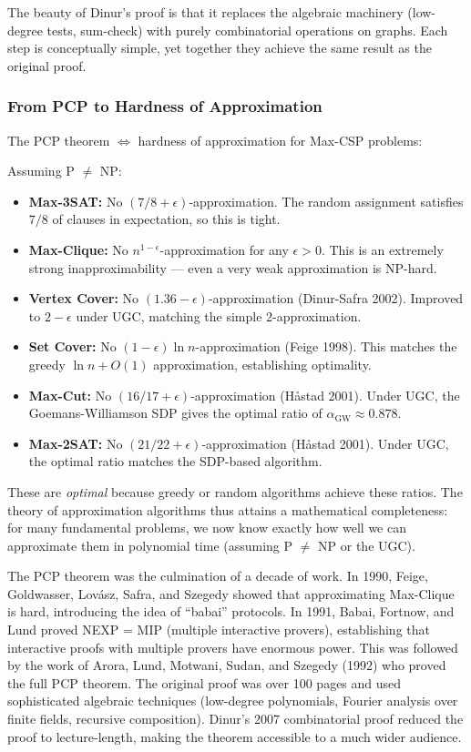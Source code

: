 The beauty of Dinur's proof is that it replaces the algebraic machinery (low-degree tests, sum-check) with purely combinatorial operations on graphs. Each step is conceptually simple, yet together they achieve the same result as the original proof.

\subsubsection*{From PCP to Hardness of Approximation}

The PCP theorem $\iff$ hardness of approximation for Max-CSP problems:

\begin{theorem}
Assuming P $\neq$ NP:
\begin{itemize}
\item \textbf{Max-3SAT:} No $(7/8 + \epsilon)$-approximation. The random assignment satisfies $7/8$ of clauses in expectation, so this is tight.
\item \textbf{Max-Clique:} No $n^{1-\epsilon}$-approximation for any $\epsilon > 0$. This is an extremely strong inapproximability — even a very weak approximation is NP-hard.
\item \textbf{Vertex Cover:} No $(1.36 - \epsilon)$-approximation (Dinur-Safra 2002). Improved to $2 - \epsilon$ under UGC, matching the simple 2-approximation.
\item \textbf{Set Cover:} No $(1 - \epsilon) \ln n$-approximation (Feige 1998). This matches the greedy $\ln n + O(1)$ approximation, establishing optimality.
\item \textbf{Max-Cut:} No $(16/17 + \epsilon)$-approximation (Håstad 2001). Under UGC, the Goemans-Williamson SDP gives the optimal ratio of $\alpha_{\text{GW}} \approx 0.878$.
\item \textbf{Max-2SAT:} No $(21/22 + \epsilon)$-approximation (Håstad 2001). Under UGC, the optimal ratio matches the SDP-based algorithm.
\end{itemize}
\end{theorem}

These are \emph{optimal} because greedy or random algorithms achieve these ratios. The theory of approximation algorithms thus attains a mathematical completeness: for many fundamental problems, we now know exactly how well we can approximate them in polynomial time (assuming P $\neq$ NP or the UGC).

The PCP theorem was the culmination of a decade of work. In 1990, Feige, Goldwasser, Lovász, Safra, and Szegedy showed that approximating Max-Clique is hard, introducing the idea of ``babai'' protocols. In 1991, Babai, Fortnow, and Lund proved NEXP = MIP (multiple interactive provers), establishing that interactive proofs with multiple provers have enormous power. This was followed by the work of Arora, Lund, Motwani, Sudan, and Szegedy (1992) who proved the full PCP theorem. The original proof was over 100 pages and used sophisticated algebraic techniques (low-degree polynomials, Fourier analysis over finite fields, recursive composition). Dinur's 2007 combinatorial proof reduced the proof to lecture-length, making the theorem accessible to a much wider audience.

